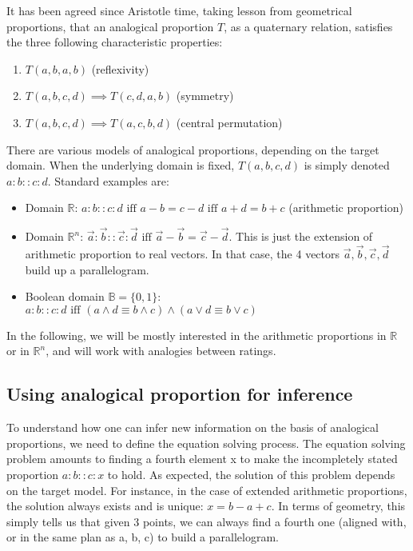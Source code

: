 \documentclass[conference]{IEEEtran}
\begin{document}
It has been agreed since Aristotle time, taking lesson from geometrical proportions, that an analogical proportion $T$, as
a quaternary relation, satisfies the three following characteristic properties:
\begin{enumerate}
\item $T(a,b,a,b)$ (reflexivity)
\item $T(a,b,c,d) \implies T(c,d,a,b)$ (symmetry)
\item $T(a,b,c,d) \implies T(a,c,b,d)$ (central permutation)
\end{enumerate}
There are various models of analogical proportions, depending on the target
domain.  When the underlying domain is fixed, $T(a,b,c,d)$ is simply denoted
$a:b::c:d$. Standard examples are:
\begin{itemize}
\item Domain $\mathbb{R}$: $a:b::c:d \text{ iff } a-b= c-d \text{ iff } a + d=
  b + c$ (arithmetic proportion)
\item Domain $\mathbb{R}^n$:
$\vec{a}:\vec{b}::\vec{c}:\vec{d} \mbox{ iff } \vec{a}-\vec{b} =
\vec{c}-\vec{d}$. This is just the extension of arithmetic proportion to real
vectors. In that case, the 4 vectors $\vec{a}, \vec{b}, \vec{c}, \vec{d}$ build
up a parallelogram.
\item Boolean domain $\mathbb{B}=\{0,1\}$:\\ $a:b::c:d \text{ iff } (a \wedge d \equiv b
  \wedge c) \wedge (a \vee d \equiv b \vee c)$
\end{itemize}

In the following, we will be mostly interested in the arithmetic proportions
in $\mathbb{R}$ or in $\mathbb{R}^n$, and will work with analogies between
ratings.

\subsection{Using analogical proportion for inference}
\label{ANALOGY_INFERENCE}
To understand how one can infer new information on the basis of analogical
proportions, we need to define the equation solving process. The equation
solving problem amounts to finding a fourth element x to make the incompletely
stated proportion $a : b :: c : x$ to hold. As expected, the solution of this
problem depends on the target model. For instance, in the case of extended
arithmetic proportions, the solution always exists and is unique: $x = b - a +
c$. In terms of geometry, this simply tells us that given 3 points, we can
always find a fourth one (aligned with, or in the same plan as a, b, c) to
build a parallelogram.
\end{document}

